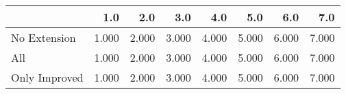 \begin{tabular}{lrrrrrrr}
\toprule
{} &   1.0 &   2.0 &   3.0 &   4.0 &   5.0 &   6.0 &   7.0 \\
\midrule
No Extension  & 1.000 & 2.000 & 3.000 & 4.000 & 5.000 & 6.000 & 7.000 \\
All           & 1.000 & 2.000 & 3.000 & 4.000 & 5.000 & 6.000 & 7.000 \\
Only Improved & 1.000 & 2.000 & 3.000 & 4.000 & 5.000 & 6.000 & 7.000 \\
\bottomrule
\end{tabular}

